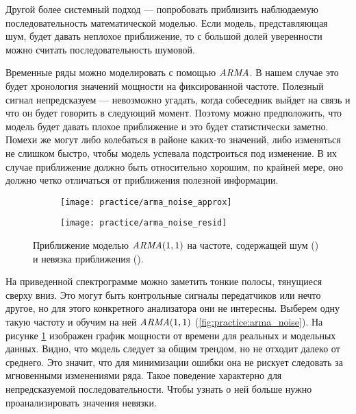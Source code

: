 Другой более системный подход --- попробовать приблизить наблюдаемую последовательность математической моделью. Если модель, представляющая шум, будет давать неплохое приближение, то с большой долей уверенности можно считать последовательность шумовой.

Временные ряды можно моделировать с помощью $\mathit{ARMA}$. В нашем случае это будет хронология значений мощности на фиксированной частоте. Полезный сигнал непредсказуем --- невозможно угадать, когда собеседник выйдет на связь и что он будет говорить в следующий момент. Поэтому можно предположить, что модель будет давать плохое приближение и это будет статистически заметно. Помехи же могут либо колебаться в районе каких-то значений, либо изменяться не слишком быстро, чтобы модель успевала подстроиться под изменение. В их случае приближение должно быть относительно хорошим, по крайней мере, оно должно четко отличаться от приближения полезной информации.

\begin{figure}[h]
  \centering
  \begin{subfigure}{0.45\textwidth}
    \texttt{[image: practice/arma\_noise\_approx]}
    \caption{}
    \label{fig:practice:arma_noise_approx}
  \end{subfigure}
  \begin{subfigure}{0.45\textwidth}
    \texttt{[image: practice/arma\_noise\_resid]}
    \caption{}
    \label{fig:practice:arma_noise_resid}
  \end{subfigure}
  \caption{Приближение моделью $\mathit{ARMA}(1,1)$ на частоте, содержащей шум () и невязка приближения ().}
  \label{fig:practice:arma_noise}
\end{figure}

На приведенной спектрограмме можно заметить тонкие полосы, тянущиеся сверху вниз. Это могут быть контрольные сигналы передатчиков или нечто другое, но для этого конкретного анализатора они не интересны. Выберем одну такую частоту и обучим на ней $\mathit{ARMA}(1,1)$ (\autoref{fig:practice:arma_noise}). На рисунке \ref{fig:practice:arma_noise_approx} изображен график мощности от времени для реальных и модельных данных. Видно, что модель следует за общим трендом, но не отходит далеко от среднего. Это значит, что для минимизации ошибки она не рискует следовать за мгновенными изменениями ряда. Такое поведение характерно для непредсказуемой последовательности. Чтобы узнать о ней больше нужно проанализировать значения невязки.


